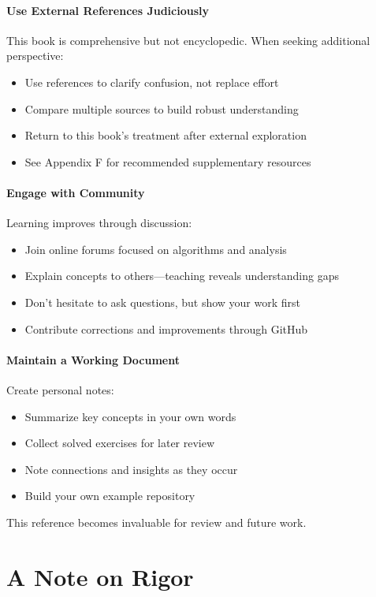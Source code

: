 \paragraph{Use External References Judiciously}
This book is comprehensive but not encyclopedic. When seeking additional perspective:
\begin{itemize}
    \item Use references to clarify confusion, not replace effort
    \item Compare multiple sources to build robust understanding
    \item Return to this book's treatment after external exploration
    \item See Appendix F for recommended supplementary resources
\end{itemize}

\paragraph{Engage with Community}
Learning improves through discussion:
\begin{itemize}
    \item Join online forums focused on algorithms and analysis
    \item Explain concepts to others—teaching reveals understanding gaps
    \item Don't hesitate to ask questions, but show your work first
    \item Contribute corrections and improvements through GitHub
\end{itemize}

\paragraph{Maintain a Working Document}
Create personal notes:
\begin{itemize}
    \item Summarize key concepts in your own words
    \item Collect solved exercises for later review
    \item Note connections and insights as they occur
    \item Build your own example repository
\end{itemize}

This reference becomes invaluable for review and future work.

\section{A Note on Rigor}

